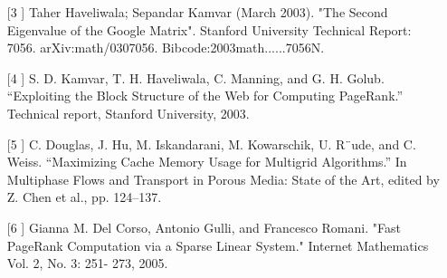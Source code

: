 \documentclass[a0,portrait]{a0poster}
\begin{document}
\begin{multicols}{2}
\begin{enumerate}
\item[[3]] Taher Haveliwala; Sepandar Kamvar (March 2003). "The Second Eigenvalue of the Google Matrix". 
Stanford University Technical Report: 7056. arXiv:math/0307056. Bibcode:2003math......7056N. 

\item[[4]] S. D. Kamvar, T. H. Haveliwala, C. Manning, and G. H. Golub. “Exploiting the Block Structure of the Web for Computing PageRank.” Technical report, Stanford University, 2003.

\item[[5]] C. Douglas, J. Hu, M. Iskandarani, M. Kowarschik, U. R¨ude, and C. Weiss. “Maximizing Cache Memory Usage for Multigrid Algorithms.” In Multiphase Flows and Transport in Porous Media: State of the Art, edited by Z. Chen et al., pp. 124–137. 

\item[[6]] Gianna M. Del Corso, Antonio Gulli, and Francesco Romani. "Fast PageRank Computation via a Sparse Linear System." Internet Mathematics Vol. 2, No. 3: 251- 273, 2005.
\end{enumerate}


\end{multicols}
\end{document}
